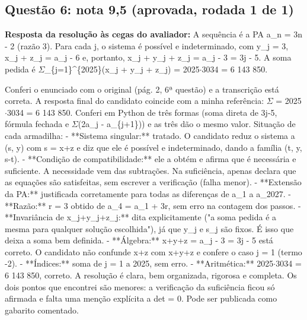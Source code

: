 \documentclass{article}%
\begin{document}
\subsection*{Questão 6: nota 9,5 (aprovada, rodada 1 de 1)}%
\textbf{Resposta da resolução às cegas do avaliador:} A sequência é a PA a\_n = 3n - 2 (razão 3). Para cada j, o sistema é possível e indeterminado, com y\_j = 3, x\_j + z\_j = a\_j - 6 e, portanto, x\_j + y\_j + z\_j = a\_j - 3 = 3j - 5. A soma pedida é $\Sigma$\_\{j=1\}\^{}\{2025\}(x\_j + y\_j + z\_j) = 2025$\cdot$3034 = 6 143 850.\par %
Conferi o enunciado com o original (pág. 2, 6ª questão) e a transcrição está correta. A resposta final do candidato coincide com a minha referência: $\Sigma$ = 2025$\cdot$3034 = 6 143 850. Conferi em Python de três formas (soma direta de 3j-5, fórmula fechada e $\Sigma$(2a\_j - a\_\{j+1\})) e as três dão o mesmo valor.\newline%
\newline%
Situação de cada armadilha:\newline%
{-} **Sistema singular:** tratado. O candidato reduz o sistema a (s, y) com s = x+z e diz que ele é possível e indeterminado, dando a família (t, y, s-t).\newline%
{-} **Condição de compatibilidade:** ele a obtém e afirma que é necessária e suficiente. A necessidade vem das subtrações. Na suficiência, apenas declara que as equações são satisfeitas, sem escrever a verificação (falha menor).\newline%
{-} **Extensão da PA:** justificada corretamente para todas as diferenças de a\_1 a a\_2027.\newline%
{-} **Razão:** r = 3 obtido de a\_4 = a\_1 + 3r, sem erro na contagem dos passos.\newline%
{-} **Invariância de x\_j+y\_j+z\_j:** dita explicitamente ("a soma pedida é a mesma para qualquer solução escolhida"), já que y\_j e s\_j são fixos. É isso que deixa a soma bem definida.\newline%
{-} **Álgebra:** x+y+z = a\_j - 3 = 3j - 5 está correto. O candidato não confunde x+z com x+y+z e confere o caso j = 1 (termo -2).\newline%
{-} **Índices:** soma de j = 1 a 2025, sem erro.\newline%
{-} **Aritmética:** 2025$\cdot$3034 = 6 143 850, correto.\newline%
\newline%
A resolução é clara, bem organizada, rigorosa e completa. Os dois pontos que encontrei são menores: a verificação da suficiência ficou só afirmada e falta uma menção explícita a det = 0. Pode ser publicada como gabarito comentado.%
\end{document}
